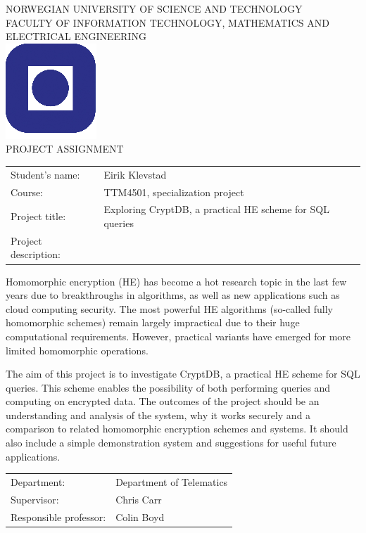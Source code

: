 \documentclass[a4paper,11pt]{article}
\begin{document}
\sffamily
\begin{titlepage}
\begin{center}
\textsc{NORWEGIAN UNIVERSITY OF SCIENCE AND TECHNOLOGY\\
FACULTY OF  INFORMATION TECHNOLOGY, MATHEMATICS AND ELECTRICAL ENGINEERING} \\
\vspace{0.5cm} 
\includegraphics[scale=0.5]{NTNU-logo} \\
\vspace{1.0cm}
{\Huge{PROJECT ASSIGNMENT}}
\vspace{1.0cm}
\end{center}

\begin{tabular}{@{}p{5cm}l}
Student's name:		& Eirik Klevstad\\
Course: 		& TTM4501, specialization project \\
Project title: 		& Exploring CryptDB, a practical HE scheme for SQL queries \\
Project description: 	& \\
\end{tabular}

Homomorphic encryption (HE) has become a hot research topic in the last few years due to breakthroughs in algorithms, as well as new applications such as cloud computing security. The most powerful HE algorithms (so-called fully homomorphic schemes) remain largely impractical due to their huge computational requirements. However, practical variants have emerged for more limited homomorphic operations.

The aim of this project is to investigate CryptDB, a practical HE scheme for SQL queries. This scheme enables the possibility of both performing queries and computing on encrypted data. The outcomes of the project should be an understanding and analysis of the system, why it works securely and a comparison to related homomorphic encryption schemes and systems. It should also include a simple demonstration system and suggestions for useful future applications.

\begin{tabular}{@{}p{5cm}l}
Department:		& Department of Telematics \\
Supervisor:		& Chris Carr \\
Responsible professor: 	& Colin Boyd \\
\end{tabular}

\end{titlepage}
\end{document}
